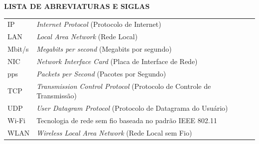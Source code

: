 \listoffigures
\newpage

\listoftables
\newpage

\begin{center}
  \textbf{LISTA DE ABREVIATURAS E SIGLAS}
\end{center}
\vspace{2\baselineskip}
\noindent
\begin{tabular}{p{2.5cm} p{11cm}}
	IP      & \textit{Internet Protocol} (Protocolo de Internet) \\[6pt]
	LAN     & \textit{Local Area Network} (Rede Local) \\[6pt]
	Mbit/s  & \textit{Megabits per second} (Megabits por segundo) \\[6pt]
	NIC     & \textit{Network Interface Card} (Placa de Interface de Rede) \\[6pt]
	pps     & \textit{Packets per Second} (Pacotes por Segundo) \\[6pt]
	TCP     & \textit{Transmission Control Protocol} (Protocolo de Controle de Transmissão) \\[6pt]
	UDP     & \textit{User Datagram Protocol} (Protocolo de Datagrama do Usuário) \\[6pt]
	Wi-Fi   & Tecnologia de rede sem fio baseada no padrão IEEE 802.11 \\[6pt]
	WLAN    & \textit{Wireless Local Area Network} (Rede Local sem Fio) \\
\end{tabular}

\newpage

\tableofcontents
\newpage
